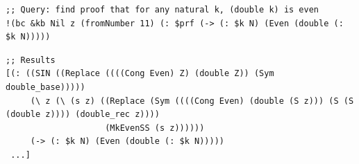 \documentclass[aspectratio=169]{beamer}
\begin{document}
\begin{frame}[fragile]

  \begin{lstlisting}
;; Query: find proof that for any natural k, (double k) is even
!(bc &kb Nil z (fromNumber 11) (: $prf (-> (: $k N) (Even (double (: $k N)))))
  \end{lstlisting}


  \begin{lstlisting}
;; Results
[(: ((SIN ((Replace ((((Cong Even) Z) (double Z)) (Sym double_base)))))
     (\ z (\ (s z) ((Replace (Sym ((((Cong Even) (double (S z))) (S (S (double z)))) (double_rec z))))
                    (MkEvenSS (s z))))))
     (-> (: $k N) (Even (double (: $k N)))))
 ...]
  \end{lstlisting}


\end{frame}
\end{document}
